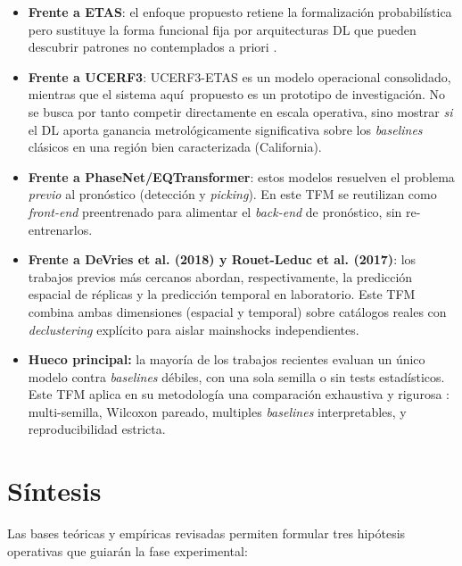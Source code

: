 \begin{itemize}
  \item \textbf{Frente a ETAS}: el enfoque propuesto retiene la formalización probabilística pero sustituye la forma funcional fija por arquitecturas DL que pueden descubrir patrones no contemplados a priori \citep{ogata1998spacetime, vandenende2024forecasting}.

  \item \textbf{Frente a UCERF3}: UCERF3-ETAS \citep{field2017ucerf3etas} es un modelo operacional consolidado, mientras que el sistema aquí\, propuesto es un prototipo de investigación. No se busca por tanto competir directamente en escala operativa, sino mostrar \emph{si} el DL aporta ganancia metrológicamente significativa sobre los \textit{baselines} clásicos en una región bien caracterizada (California).

  \item \textbf{Frente a PhaseNet/EQTransformer}: estos modelos resuelven el problema \emph{previo} al pronóstico (detección y \textit{picking}). En este TFM se reutilizan como \emph{front-end} preentrenado para alimentar el \emph{back-end} de pronóstico, sin re-entrenarlos.

  \item \textbf{Frente a DeVries et al. (2018) y Rouet-Leduc et al. (2017)}: los trabajos previos más cercanos abordan, respectivamente, la predicción espacial de réplicas y la predicción temporal en laboratorio. Este TFM combina ambas dimensiones (espacial y temporal) sobre catálogos reales con \emph{declustering} explícito para aislar mainshocks independientes.

  \item \textbf{Hueco principal:} la mayoría de los trabajos recientes evaluan un único modelo contra \textit{baselines} débiles, con una sola semilla o sin tests estadísticos. Este TFM aplica en su metodología una comparación exhaustiva y rigurosa \citep{beroza2021dlreview, reichstein2019deep}: multi-semilla, Wilcoxon pareado, multiples \textit{baselines} interpretables, y reproducibilidad estricta.
\end{itemize}

\section{Síntesis}
\label{sintesis}

Las bases teóricas y empíricas revisadas permiten formular tres hipótesis operativas que guiarán la fase experimental:

